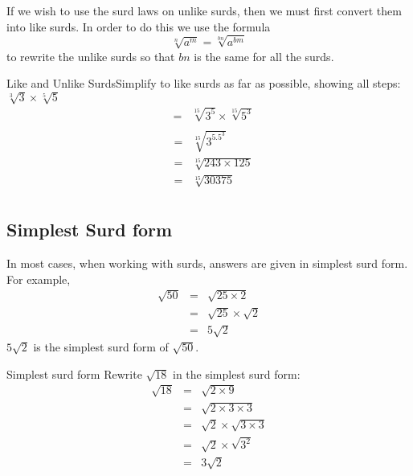 If we wish to use the surd laws on unlike surds, then we must first convert
them into like surds. In order to do this we use the formula
\begin{equation} 
\label{eq:mn:s:like}
\sqrt[n]{a^m}=\sqrt[bn]{a^{bm}}
\end{equation}
to rewrite the unlike surds so that $bn$ is the same for all the surds.

\begin{wex}{Like and Unlike Surds}{Simplify to like surds as far as possible, showing all steps:  $\sqrt[3]{3}\times \sqrt[5]{5}$}{
\begin{eqnarray*}
&=&\sqrt[15]{3^5}\times \sqrt[15]{5^3}\\
\end{eqnarray*}
\begin{eqnarray*}
&=&\sqrt[15]{3^5.5^3}\\
&=&\sqrt[15]{243\times 125}\\
&=&\sqrt[15]{30 375}\\
\end{eqnarray*}
}
\end{wex}

\subsection{Simplest Surd form}
In most cases, when working with surds, answers are given in simplest surd form.
For example,
\begin{eqnarray*}
\sqrt{50} &=& \sqrt{25 \times 2}\\
&=& \sqrt{25}\times \sqrt{2}\\
&=& 5\sqrt{2}
\end{eqnarray*}
$5\sqrt{2}$ is the simplest surd form of $\sqrt{50}$.

\begin{wex}{Simplest surd form}
{Rewrite $\sqrt{18}$ in the simplest surd form:}{
\begin{eqnarray*}
\sqrt{18} &=& \sqrt{2\times 9}\\
&=& \sqrt{2\times 3\times 3}\\
&=& \sqrt{2}\times \sqrt{3\times 3}\\
&=& \sqrt{2}\times \sqrt{3^{2}}\\
&=& 3\sqrt{2}
\end{eqnarray*}
}
\end{wex}

